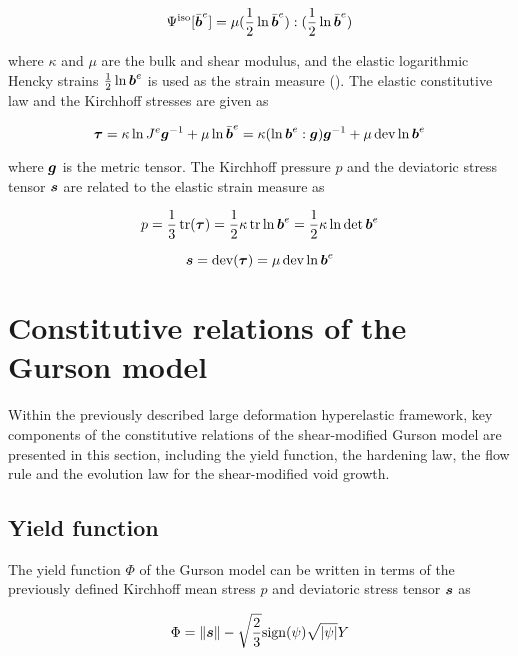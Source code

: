 \begin{equation}
  \Psi^{\rm iso}[\bar{{\boldsymbol{b}}}^e] = \mu(\frac{1}{2}\ln\bar{{\boldsymbol{b}}}^e):(\frac{1}{2}\ln\bar{{\boldsymbol{b}}}^e)
\end{equation}

where $\kappa$ and $\mu$ are the bulk and shear modulus, and the elastic logarithmic Hencky strains $\frac{1}{2}\ln{\boldsymbol{b}}^e$ is used as the strain measure (\cite{Steinmann1994}). The elastic constitutive law and the Kirchhoff stresses are given as

\begin{equation}\label{eq:Kirchhoff}
{\boldsymbol{\tau}}=\kappa\ln J^e{\boldsymbol{g}}^{-1} + \mu\ln\bar{{\boldsymbol{b}}}^e = \kappa(\ln{\boldsymbol{b}}^e:{\boldsymbol{g}}){\boldsymbol{g}}^{-1} + \mu\operatorname{\text{dev}}\ln{\boldsymbol{b}}^e
\end{equation}

where ${\boldsymbol{g}}$ is the metric tensor. The Kirchhoff pressure $p$ and the deviatoric stress tensor ${\boldsymbol{s}}$ are related to the elastic strain measure as

\begin{equation}\label{eq:p}
p = \frac{1}{3}\operatorname{\text{tr}}({\boldsymbol{\tau}}) = \frac{1}{2}\kappa\operatorname{\text{tr}}\ln{\boldsymbol{b}}^e = \frac{1}{2}\kappa\ln\det{\boldsymbol{b}}^e
\end{equation}

\begin{equation}\label{eq:s}
{\boldsymbol{s}} = \operatorname{\text{dev}}({\boldsymbol{\tau}}) = \mu\operatorname{\text{dev}}\ln{\boldsymbol{b}}^e
\end{equation}

\section{Constitutive relations of the Gurson model}
Within the previously described large deformation hyperelastic framework, key components of the constitutive relations of the shear-modified Gurson model are presented in this section, including the yield function, the hardening law, the flow rule and the evolution law for the shear-modified void growth.

\subsection{Yield function}

The yield function $\Phi$ of the Gurson model can be written in terms of the previously defined Kirchhoff mean stress $p$ and deviatoric stress tensor ${\boldsymbol{s}}$ as

\begin{equation}\label{eq:Phi}
\Phi = \|{\boldsymbol{s}}\| - \sqrt{\frac{2}{3}}{\rm sign}(\psi)\sqrt{|\psi|} Y
\end{equation}

